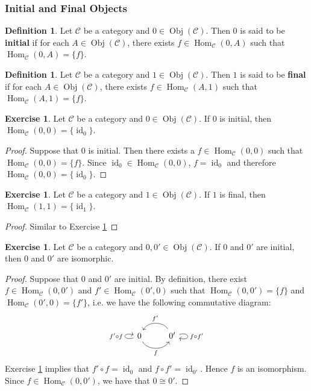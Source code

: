 \documentclass[12pt]{amsart}
\theoremstyle{definition}
\newtheorem{defn}[definition]{Definition}
\newtheorem{ex}[definition]{Exercise}
\newcommand{\MC}{\mathcal{C}}
\DeclareMathOperator{\id}{id}
\DeclareMathOperator{\Obj}{Obj}
\DeclareMathOperator{\Hom}{Hom}
\DeclareMathOperator*{\0}{\mbf{0}}
\DeclareMathOperator*{\1}{\mbf{1}}
\newcommand{\lex}[1]{\label{ex:#1}}
\newcommand{\ld}[1]{\label{defn:#1}}
\newcommand{\rex}[1]{Exercise \ref{ex:#1}}
\begin{document}
	\subsubsection{Initial and Final Objects}
	
	\begin{defn} \ld{15012}
		Let $\MC$ be a category and $0 \in \Obj(\MC)$. Then $0$ is said to be \textbf{initial} if for each $A \in \Obj(\MC)$, there exists $f \in \Hom_{\MC}(0, A)$ such that $\Hom_{\MC}(0, A) = \{f\}$. 
	\end{defn}

	\begin{defn} \ld{15012.1}
		Let $\MC$ be a category and $1 \in \Obj(\MC)$. Then $1$ is said to be \textbf{final} if for each $A \in \Obj(\MC)$, there exists $f \in \Hom_{\MC}(A, 1)$ such that $\Hom_{\MC}(A, 1) = \{f\}$. 
	\end{defn}
	
	\begin{ex} \lex{15013}
		Let $\MC$ be a category and $0 \in \Obj(\MC)$. If $0$ is initial, then $\Hom_{\MC}(0, 0) = \{\id_0\}$.
	\end{ex}
	
	\begin{proof}
		Suppose that $0$ is initial. Then there exists a $f \in \Hom_{\MC}(0,0)$ such that $\Hom_{\MC}(0, 0) = \{f\}$. Since $\id_0 \in \Hom_{\MC}(0,0)$, $f = \id_0$ and therefore $\Hom_{\MC}(0, 0) = \{\id_0\}$.
	\end{proof}

		\begin{ex} \lex{15013.1}
		Let $\MC$ be a category and $1 \in \Obj(\MC)$. If $1$ is final, then $\Hom_{\MC}(1, 1) = \{\id_1\}$.
	\end{ex}
	
	\begin{proof}
		Similar to \rex{15013}
	\end{proof}
	
	\begin{ex} \lex{15014}
		Let $\MC$ be a category and $0, 0' \in \Obj(\MC)$. If $0$ and $0'$ are initial, then $0$ and $0'$ are isomorphic.
	\end{ex}
	
	\begin{proof}
		Suppose that $0$ and $0'$ are initial. By definition, there exist $f \in \Hom_{\MC}(0, 0')$ and $f' \in \Hom_{\MC}(0', 0)$ such that $\Hom_{\MC}(0, 0') = \{f\}$ and $\Hom_{\MC}(0', 0) = \{f'\}$, i.e. we have the following commutative diagram:
		\[ 
		\begin{tikzcd}[baseline= 7]
			\arrow[loop left, "f' \circ f"] 0 \arrow[r, bend right= 60, "f", swap] & 0' \arrow[l, bend left=-60, "f'", swap] \arrow[loop right, "f \circ f'"] \\
		\end{tikzcd}
		\]
		\rex{15013} implies that $f' \circ f = \id_{0}$ and $f \circ f' = \id_{0'}$. Hence $f$ is an isomorphism. Since $f \in \Hom_{\MC}(0, 0')$, we have that $0 \cong 0'$.
	\end{proof}
\end{document}

